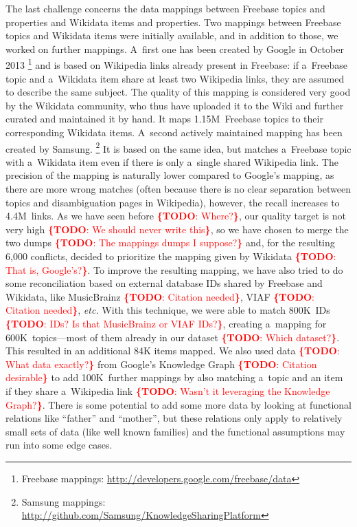 \documentclass{sig-alternate}
\newcommand{\todo}[1]{\noindent\textcolor{red}{{\bf \{TODO}: #1{\bf \}}}}
\begin{document}
The last challenge concerns the data mappings between Freebase topics and properties
and Wikidata items and properties.
Two mappings between Freebase topics and Wikidata items were initially available,
and in addition to those, we worked on further mappings.
A~first one has been created by Google in October 2013%
\footnote{Freebase mappings: \url{http://developers.google.com/freebase/data}}
and is based on Wikipedia links already present in Freebase: if a~Freebase topic and
a~Wikidata item share at least two Wikipedia links, they are assumed to describe the same subject.
The quality of this mapping is considered very good by the Wikidata community,
who thus have uploaded it to the Wiki and further curated and maintained it by hand.
It maps 1.15M~Freebase topics to their corresponding Wikidata items.
A~second actively maintained mapping has been created by Samsung.%
\footnote{Samsung mappings: \url{http://github.com/Samsung/KnowledgeSharingPlatform}}
It is based on the same idea, but matches a~Freebase topic with a~Wikidata item
even if there is only a~single shared Wikipedia link.
The precision of the mapping is naturally lower compared to Google's mapping,
as there are more wrong matches (often because there is no clear separation between topics
and disambiguation pages in Wikipedia), however, the recall increases to 4.4M~links.
As we have seen before \todo{Where?}, our quality target is not very high \todo{We should never write this},
so we have chosen to merge the two dumps \todo{The mappings dumps I suppose?} and, for the resulting 6,000 conflicts,
decided to prioritize the mapping given by Wikidata \todo{That is, Google's?}.
To improve the resulting mapping, we have also tried to do some reconciliation
based on external database IDs shared by Freebase and Wikidata, like MusicBrainz \todo{Citation needed}, VIAF \todo{Citation needed}, \emph{etc.}
With this technique, we were able to match 800K~IDs \todo{IDs? Is that MusicBrainz or VIAF IDs?},
creating a~mapping for 600K~topics---most of them already in our dataset \todo{Which dataset?}.
This resulted in an additional 84K items mapped.
We also used data \todo{What data exactly?} from Google's Knowledge Graph \todo{Citation desirable} to add 100K~further mappings
by also matching a~topic and an item if they share a~Wikipedia link \todo{Wasn't it leveraging the Knowledge Graph?}.
There is some potential to add some more data by looking at functional relations
like ``father'' and ``mother'', but these relations only apply to relatively small sets of data
(like well known families) and the functional assumptions may run into some edge cases.
\end{document}
